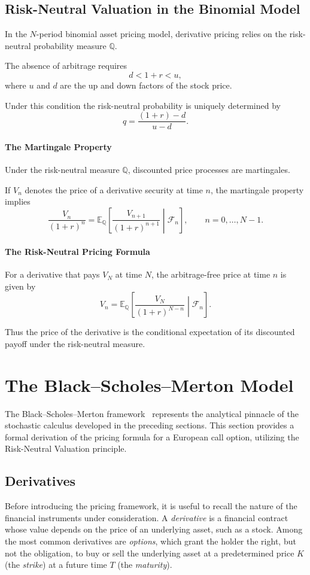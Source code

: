 \subsection{Risk-Neutral Valuation in the Binomial Model}

In the $N$-period binomial asset pricing model, derivative pricing relies on the risk-neutral probability measure $\mathbb Q$.

The absence of arbitrage requires
\[
d < 1+r < u,
\]
where $u$ and $d$ are the up and down factors of the stock price.

Under this condition the risk-neutral probability is uniquely determined by
\[
q=\frac{(1+r)-d}{u-d}.
\]
\paragraph{The Martingale Property}

Under the risk-neutral measure $\mathbb Q$, discounted price processes are martingales.

If $V_n$ denotes the price of a derivative security at time $n$, the martingale property implies
\[
\frac{V_n}{(1+r)^n}
=
\mathbb E_{\mathbb Q}
\left[
\frac{V_{n+1}}{(1+r)^{n+1}}
\middle|
\mathcal F_n
\right],
\qquad n=0,\dots,N-1.
\]
\paragraph{The Risk-Neutral Pricing Formula}

For a derivative that pays $V_N$ at time $N$, the arbitrage-free price at time $n$ is given by
\[
V_n
=
\mathbb E_{\mathbb Q}
\left[
\frac{V_N}{(1+r)^{N-n}}
\middle|
\mathcal F_n
\right].
\]

Thus the price of the derivative is the conditional expectation of its discounted payoff under the risk-neutral measure.

\section{The Black--Scholes--Merton Model}
\label{sec:bsm-model}

The Black--Scholes--Merton framework~\cite{BlackScholes1973,Merton1973} represents the analytical pinnacle of the stochastic calculus developed in the preceding sections. This section provides a formal derivation of the pricing formula for a European call option, utilizing the Risk-Neutral Valuation principle.
\subsection{Derivatives}
Before introducing the pricing framework, it is useful to recall the nature of the financial instruments under consideration. A \textit{derivative} is a financial contract whose value depends on the price of an underlying asset, such as a stock. Among the most common derivatives are \textit{options}, which grant the holder the right, but not the obligation, to buy or sell the underlying asset at a predetermined price $K$ (the \textit{strike}) at a future time $T$ (the \textit{maturity}).

